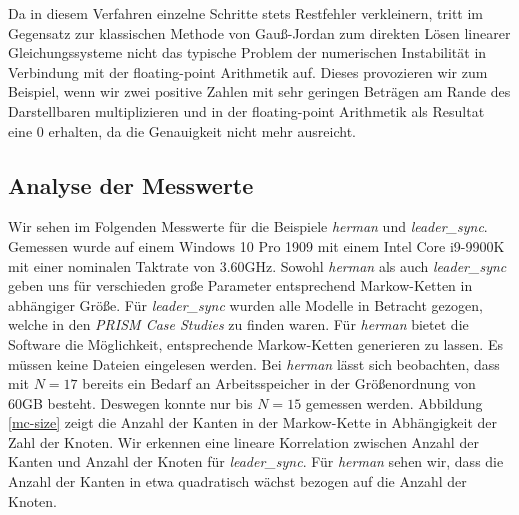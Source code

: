 \documentclass[a4paper]{article}
\newcommand{\mc}{Markow-Kette}
\theoremstyle{nonumberplain}
\begin{document}
	Da in diesem Verfahren einzelne Schritte stets Restfehler verkleinern, tritt im Gegensatz zur klassischen Methode von Gauß-Jordan zum direkten Lösen linearer Gleichungssysteme nicht das typische Problem der numerischen Instabilität in Verbindung mit der floating-point Arithmetik auf. Dieses provozieren wir zum Beispiel, wenn wir zwei positive Zahlen mit sehr geringen Beträgen am Rande des Darstellbaren multiplizieren und in der floating-point Arithmetik als Resultat eine $0$ erhalten, da die Genauigkeit nicht mehr ausreicht.
	
	\subsection{Analyse der Messwerte}
	
	
	Wir sehen im Folgenden Messwerte für die Beispiele \textit{herman} und \textit{leader\_sync}. Gemessen wurde auf einem Windows 10 Pro 1909 mit einem Intel Core i9-9900K mit einer nominalen Taktrate von 3.60GHz.
	Sowohl \textit{herman} als auch \textit{leader\_sync} geben uns für verschieden große Parameter entsprechend \mc{}n in abhängiger Größe. Für \textit{leader\_sync} wurden alle Modelle in Betracht gezogen, welche in den \textit{PRISM Case Studies} \cite{PRISMCS} zu finden waren. Für \textit{herman} bietet die Software die Möglichkeit, entsprechende \mc{}n generieren zu lassen. Es müssen keine Dateien eingelesen werden. Bei \textit{herman} lässt sich beobachten, dass mit $N=17$ bereits ein Bedarf an Arbeitsspeicher in der Größenordnung von 60GB besteht. Deswegen konnte nur bis $N=15$ gemessen werden. Abbildung \ref{mc-size} zeigt die Anzahl der Kanten in der \mc{} in Abhängigkeit der Zahl der Knoten. Wir erkennen eine lineare Korrelation zwischen Anzahl der Kanten und Anzahl der Knoten für \textit{leader\_sync}. Für \textit{herman} sehen wir, dass die Anzahl der Kanten in etwa quadratisch wächst bezogen auf die Anzahl der Knoten.
	
\end{document}
